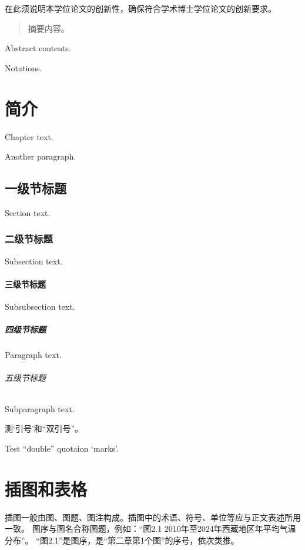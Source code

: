 \frontmatter
\begin{innovations}
  在此须说明本学位论文的创新性，确保符合学术博士学位论文的创新要求。
\end{innovations}


\begin{abstract}
  摘要内容。
\end{abstract}

\begin{abstract*}
  Abstract contents.
\end{abstract*}

\tableofcontents

\begin{notation}
  Notations.
\end{notation}

\mainmatter
\chapter{简介}
Chapter text. \par
Another paragraph.
\section{一级节标题}
Section text.
\subsection{二级节标题}
Subsection text.
\subsubsection{三级节标题}
Subsubsection text.
\paragraph{四级节标题}
Paragraph text.
\subparagraph{五级节标题}
Subparagraph text.

测‘引号’和“双引号”。

Test “double” quotaion ‘marks’.

\chapter{插图和表格}

插图一般由图、图题、图注构成。插图中的术语、符号、单位等应与正文表述所用一致。
图序与图名合称图题，例如：“图2.1  2010年至2024年西藏地区年平均气温分布”。
“图2.1”是图序，是“第二章第1个图”的序号，依次类推。

